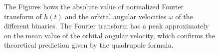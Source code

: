 \begin{figure}
   \quad

  \quad
{}
   
   
\caption{The Figures hows the absolute  value of normalized Fourier transform of $h(t)$ and the orbital angular velocities $\omega$ of the different binaries. The Fourier transform has a peak approximately on the mean value of the orbital angular velocity, which confirms the theoretical prediction given by the quadrupole formula.}
\label{fourier_omega_b345}

\end{figure}
